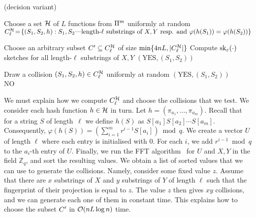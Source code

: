 \begin{algorithm}[ht]
\caption{\kApproxLCS (decision variant)}
\begin{algorithmic}[1]
\State Choose a set $\mathcal{H}$ of $L$ functions from $\Pi^m$ uniformly at random
\State $C^{\mathcal{H}}_{\ell}\!=\!\{(S_1,S_2, h) : S_1, S_2\text{---length-$\ell$ substrings of $X,Y$ resp. and }\varphi(h(S_1)) = \varphi(h(S_2))\}$\label{ln:hashes}

\State Choose an arbitrary subset $C' \subseteq C^{\mathcal{H}}_{\ell}$ of size $\min\{4nL,|C^{\mathcal{H}}_{\ell}|\}$
\State Compute $\mathrm{sk}_\varepsilon(\cdot)$ sketches for all length-$\ell$ substrings of $X, Y$  \label{ln:sketches}
 \label{ln:test1}
	 \label{ln:Hamming_dist}\Return $(\text{YES},(S_1,S_2))$
	\EndIf
\EndFor

\State Draw a collision $(S_1, S_2, h) \in C^{\mathcal{H}}_{\ell}$ uniformly at random \label{ln:test2}
 \label{ln:test3}\Return $(\text{YES},(S_1,S_2))$
\EndIf\\
\Return NO
\end{algorithmic}
\label{alg:LSH}
\end{algorithm}

We must explain how we compute $C^{\mathcal{H}}_{\ell}$ and choose the collisions that we test. We consider each hash function $h \in \mathcal{H}$ in turn. Let $h = (\pi_{a_1},\ldots,\pi_{a_m})$. Recall that for a string $S$ of length~$\ell$ we define $h(S)$ as $S[a_{1}] S[a_{2}] \cdots S[a_{m}]$. Consequently, $\varphi(h(S)) =  (\sum_{i=1}^m r^{i-1} S[a_{i}]) \bmod q$. We create a vector $U$ of length $\ell$ where each entry is initialised with $0$. For each $i$, we add $r^{i-1} \bmod q$ to the $a_{i}$-th entry of $U$. Finally, we run the FFT algorithm~\cite{FischerPaterson} for $U$ and $X, Y$ in the field $\mathbb{Z}_q$, and sort the resulting values. We obtain a list of sorted values that we can use to generate the collisions. Namely, consider some fixed value $z$. Assume that there are $x$ substrings of $X$ and $y$ substrings of $Y$ of length $\ell$ such that the fingerprint of their projection is equal to $z$. The value $z$ then gives $xy$ collisions, and we can generate each one of them in constant time. This explains how to choose the subset $C'$ in $\mathcal{O}(nL \log n)$ time.

